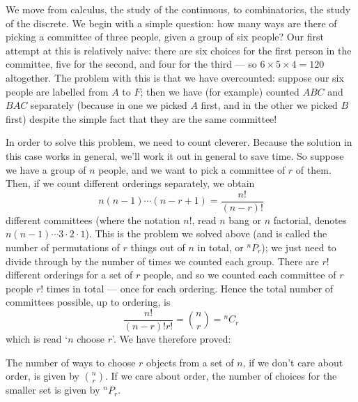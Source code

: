 



We move from calculus, the study of the continuous, to combinatorics, the study of the discrete. We begin with a simple
question: how many ways are there of picking a committee of three people, given a group of six people? Our first attempt
at this is relatively naive: there are six choices for the first person in the committee, five for the second, and four
for the third --- so $ 6 \times 5 \times 4 = 120 $ altogether. The problem with this is that we have overcounted: suppose
our six people are labelled from $ A $ to $ F $; then we have (for example) counted $ ABC $ and $ BAC $ separately (because
in one we picked $ A $ first, and in the other we picked $ B $ first) despite the simple fact that they are the same committee!

In order to solve this problem, we need to count cleverer. Because the solution in this case works in general, we'll work it
out in general to save time. So suppose we have a group of $ n $ people, and we want to pick a committee of $ r $ of them. Then,
if we count different orderings separately, we obtain
\begin{displaymath}
  n(n-1)\cdots(n - r + 1) = \frac{n!}{(n - r)!}
\end{displaymath}
different committees (where the notation $ n! $, read $ n $ bang or $ n $ factorial, denotes $ n(n-1)\cdots3 \cdot 2 \cdot 1 $). This
is the problem we solved above (and is called the number of permutations of $ r $ things out of $ n $ in total, or $ {}^nP_r $); we just
need to divide through by the number of times we counted each group. There are $ r! $ different orderings for a set of $ r $ people, and
so we counted each committee of $ r $ people $ r! $ times in total --- once for each ordering. Hence the total number of committees
possible, up to ordering, is
\begin{displaymath}
  \frac{n!}{(n - r)!r!} = \binom{n}{r} = {}^nC_r
\end{displaymath}
which is read `$ n $ choose $ r $'. We have therefore proved:

\begin{thm}
  The number of ways to choose $ r $ objects from a set of $ n $, if we don't care about order, is
  given by $ \binom{n}{r} $. If we care about order, the number of choices for the smaller set
  is given by $ {}^nP_r $.
\end{thm}


